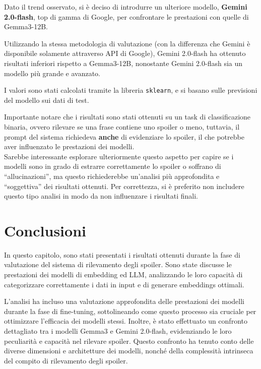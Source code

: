 Dato il trend osservato, si è deciso di introdurre un
ulteriore modello, \textbf{Gemini 2.0-flash}, top di gamma
di Google, per confrontare le prestazioni con quelle di
Gemma3-12B.

Utilizzando la stessa metodologia di valutazione (con la
differenza che Gemini è disponibile solamente attraverso
API di Google), Gemini 2.0-flash ha ottenuto risultati
inferiori rispetto a Gemma3-12B, nonostante Gemini
2.0-flash sia un modello più grande e avanzato.

I valori sono stati calcolati tramite la libreria
\texttt{sklearn}, e si basano sulle previsioni del modello
sui dati di test.

Importante notare che i risultati sono stati ottenuti su un
task di classificazione binaria, ovvero rilevare se una
frase contiene uno spoiler o meno, tuttavia, il prompt del
sistema richiedeva \textbf{anche} di evidenziare lo
spoiler, il che potrebbe aver influenzato le prestazioni
dei modelli.
\\

\noindent
Sarebbe interessante esplorare ulteriormente questo aspetto
per capire se i modelli sono in grado di estrarre correttamente
lo spoiler o soffrano di ``allucinazioni'', ma questo
richiederebbe un'analisi più approfondita e ``soggettiva''
dei risultati ottenuti.
Per correttezza, si è preferito non includere questo tipo
analisi in modo da non influenzare i risultati finali.

\section{Conclusioni}
\label{sec:conclusioni}

In questo capitolo, sono stati presentati i risultati
ottenuti durante la fase di valutazione del sistema di
rilevamento degli spoiler.
Sono state discusse le prestazioni dei modelli di embedding
ed LLM, analizzando le loro capacità di categorizzare
correttamente i dati in input e di generare embeddings
ottimali.

L'analisi ha incluso una valutazione approfondita delle
prestazioni dei modelli durante la fase di fine-tuning,
sottolineando come questo processo sia cruciale per
ottimizzare l'efficacia dei modelli stessi.
Inoltre, è stato effettuato un confronto dettagliato tra i
modelli Gemma3 e Gemini 2.0-flash, evidenziando le loro
peculiarità e capacità nel rilevare spoiler.
Questo confronto ha tenuto conto delle diverse dimensioni e
architetture dei modelli, nonché della complessità
intrinseca del compito di rilevamento degli spoiler.

